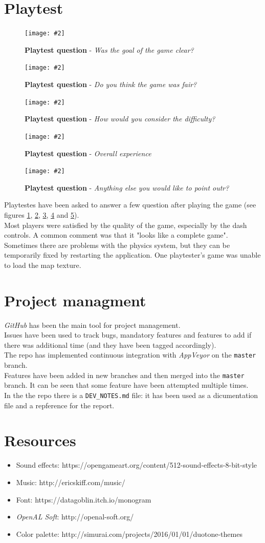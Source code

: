 \documentclass[10pt, a4paper]{article}
\newcommand{\figuremacro}[5]{
    \begin{figure}[#1]
        \centering
        \texttt{[image: \#2]}
        \caption[#3]{\textbf{#3}#4}
        \label{fig:#2}
    \end{figure}
}
\begin{document}
    \section{Playtest}
    \figuremacro{h}{playtest01}{Playtest question}{ - \textit{Was the goal of the game clear?}}{1.0}
    \figuremacro{h}{playtest02}{Playtest question}{ - \textit{Do you think the game was fair?}}{1.0}
    \figuremacro{h}{playtest03}{Playtest question}{ - \textit{How would you consider the difficulty?}}{1.0}
    \figuremacro{h}{playtest04}{Playtest question}{ - \textit{Overall experience}}{1.0}
    \figuremacro{h}{playtest05}{Playtest question}{ - \textit{Anything else you would like to point outr?}}{1.0}
    Playtestes have been asked to answer a few question after playing the game (see figures \ref{fig:playtest01}, \ref{fig:playtest02}, \ref{fig:playtest03}, \ref{fig:playtest04} and \ref{fig:playtest05}).\\
    Most players were satisfied by the quality of the game, especially by the dash controls. A common comment was that it "looks like a complete game".
    Sometimes there are problems with the physics system, but they can be temporarily fixed by restarting the application.
    One playtester's game was unable to load the map texture.
    
    \section{Project managment}
    \textit{GitHub} has been the main tool for project management.\\
    Issues have been used to track bugs, mandatory features and features to add if there was additional time (and they have been tagged accordingly).\\
    The repo has implemented continuous integration with \textit{AppVeyor} on the \texttt{master} branch.\\
    Features have been added in new branches and then merged into the \texttt{master} branch. It can be seen that some feature have been attempted multiple times.\\
    In the the repo there is a \texttt{DEV\_NOTES.md} file: it has been used as a dicumentation file and a repference for the report.
    
    \section{Resources}
    \begin{itemize}
    	\item Sound effects: https://opengameart.org/content/512-sound-effects-8-bit-style
    	\item Music: http://ericskiff.com/music/
    	\item Font: https://datagoblin.itch.io/monogram
    	\item \textit{OpenAL Soft}: http://openal-soft.org/
    	\item Color palette: http://simurai.com/projects/2016/01/01/duotone-themes
    \end{itemize}
		
\end{document}
